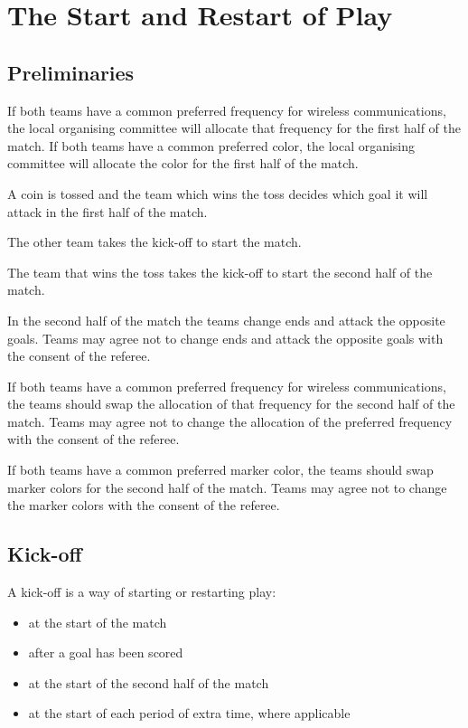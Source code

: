 \section{The Start and Restart of Play}\label{sec:start-and-restart-of-play}

\subsection{Preliminaries}
If both teams have a common preferred frequency for wireless communications, the local organising committee will allocate that frequency for the first half of the match.
If both teams have a common preferred color, the local organising committee will allocate the color for the first half of the match.

A coin is tossed and the team which wins the toss decides which goal it will attack in the first half of the match.

The other team takes the kick-off to start the match.

The team that wins the toss takes the kick-off to start the second half of the match.

In the second half of the match the teams change ends and attack the opposite goals.
Teams may agree not to change ends and attack the opposite goals with the consent of the referee.

If both teams have a common preferred frequency for wireless communications, the teams should swap the allocation of that frequency for the second half of the match.
Teams may agree not to change the allocation of the preferred frequency with the consent of the referee.

If both teams have a common preferred marker color, the teams should swap marker colors for the second half of the match.
Teams may agree not to change the marker colors with the consent of the referee.

\subsection{Kick-off}
A kick-off is a way of starting or restarting play:
\begin{itemize}
\item at the start of the match
\item after a goal has been scored
\item at the start of the second half of the match
\item at the start of each period of extra time, where applicable
\end{itemize}

